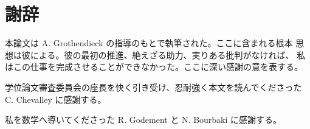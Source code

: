 \chapter*{謝辞}

本論文は A. Grothendieck の指導のもとで執筆された。ここに含まれる根本
思想は彼による。彼の最初の推進、絶えざる助力、実りある批判がなければ、
私はこの仕事を完成させることができなかった。ここに深い感謝の意を表する。

学位論文審査委員会の座長を快く引き受け、忍耐強く本文を読んでくださった
C. Chevalley に感謝する。

私を数学へ導いてくださった R. Godement と N. Bourbaki に感謝する。
